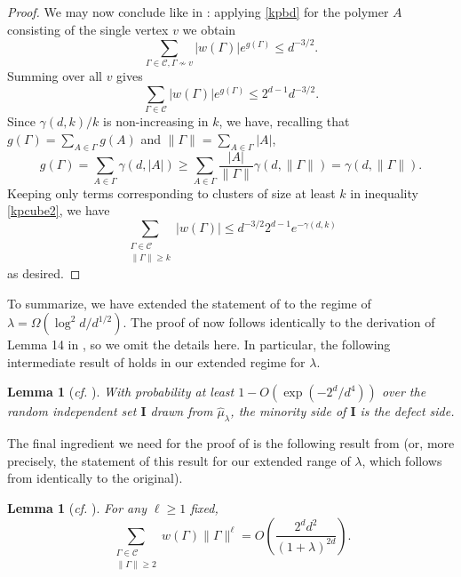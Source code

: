 \documentclass[10pt,a4paper]{amsart}
\newtheorem{lem}[thm]{Lemma}
\theoremstyle{definition}
\newcommand{\cC}{\mathcal{C} }
\newcommand{\beq}[1]{\begin{equation}\label{#1}}
\newcommand{\enq}[0]{\end{equation}}
\newcommand{\0}[0]{\emptyset}
\newcommand{\lam}{\lambda}
\begin{document}
\begin{proof}
    We may now conclude like in \cite{hypercube}: applying \eqref{kpbd} for the polymer $A$ consisting of the single vertex $v$ we obtain
    \[ \sum_{\Gamma\in\cC , \Gamma\not\sim v} |w(\Gamma)|e^{g(\Gamma)} \leq d^{-3/2}.\]
    Summing over all $v$ gives
    \beq{kpcube2} \sum_{\Gamma\in\cC} |w(\Gamma)|e^{g(\Gamma)} \leq 2^{d-1}d^{-3/2}. \enq
    Since $\gamma(d, k)/k$ is non-increasing in $k$, we have, recalling that $g(\Gamma)=\sum_{A\in\Gamma} g(A)$ and $\|\Gamma\|=\sum_{A\in\Gamma} |A|$,
    \[ g(\Gamma)=\sum_{A\in\Gamma} \gamma(d, |A|)\geq \sum_{A\in\Gamma} \frac{|A|}{\|\Gamma\|} \gamma(d, \|\Gamma\|) = \gamma(d, \|\Gamma\|). \]
    Keeping only terms corresponding to clusters of size at least $k$ in inequality \eqref{kpcube2}, we have
    \[ \sum_{\substack{\Gamma\in\cC \\ \|\Gamma\| \geq k}} |w(\Gamma)| \leq d^{-3/2}2^{d-1}e^{-\gamma(d, k)}\]
    as desired.
\end{proof}

To summarize, we have extended the statement of \cite[Lemma 15]{hypercube} to the regime of $\lam=\Omega(\log^2 d/d^{1/2})$. The proof of  now follows identically to the derivation of Lemma 14 in \cite{hypercube}, so we omit the details here. In particular, the following intermediate result of \cite{hypercube} holds in our extended regime for $\lam$.

\begin{lem}[\textit{cf.} {\cite[Lemma 17]{hypercube}}] \label{lem17}
    With probability at least $1-O(\exp(-2^d/d^4))$ over the random independent set $\mathbf{I}$ drawn from $\hat{\mu}_\lam$, the minority side of $\mathbf{I}$ is the defect side.
\end{lem}

The final ingredient we need for the proof of  is the following result from \cite{struct} (or, more precisely, the statement of this result for our extended range of $\lam$, which follows from  identically to the original).
\begin{lem}[\textit{cf.} {\cite[Lemma 11]{struct}}] \label{lem11}
    For any $\ell\geq 1$ fixed,
    \[ \sum_{\substack{\Gamma\in\cC \\ \|\Gamma\|\geq 2}} w(\Gamma)\|\Gamma\|^{\ell} =O\left(\frac{2^d d^2}{(1+\lam)^{2d}} \right).\]
\end{lem}
\end{document}
